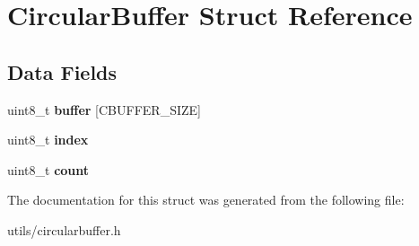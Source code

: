 \hypertarget{struct_circular_buffer}{}\section{Circular\+Buffer Struct Reference}
\label{struct_circular_buffer}
\subsection*{Data Fields}
\begin{DoxyCompactItemize}
\item 
\mbox{\label{struct_circular_buffer_a963720103dfa9d20c780ac063228452a}} 
uint8\+\_\+t {\bfseries buffer} \mbox{[}C\+B\+U\+F\+F\+E\+R\+\_\+\+S\+I\+ZE\mbox{]}
\item 
\mbox{\label{struct_circular_buffer_aae5a12e607d0f782506d9e6ec6179c64}} 
uint8\+\_\+t {\bfseries index}
\item 
\mbox{\label{struct_circular_buffer_a20302e2c99a60d3f612dba57e3f6333b}} 
uint8\+\_\+t {\bfseries count}
\end{DoxyCompactItemize}


The documentation for this struct was generated from the following file\+:\begin{DoxyCompactItemize}
\item 
utils/circularbuffer.\+h\end{DoxyCompactItemize}
